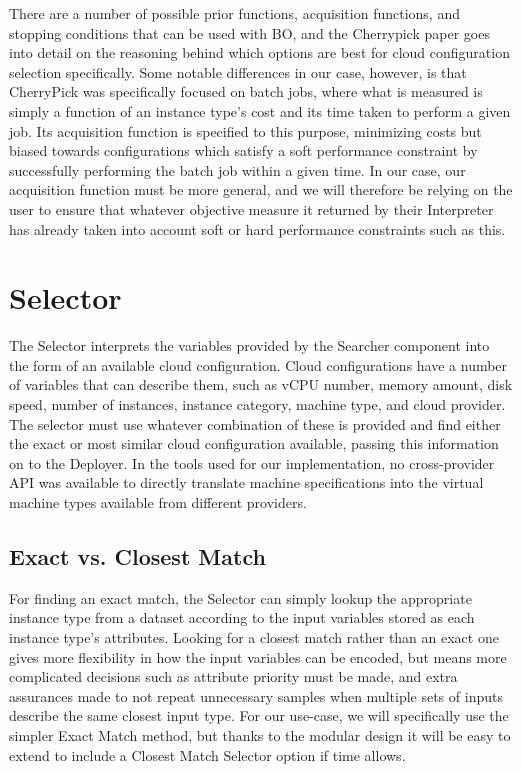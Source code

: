 \documentclass{report}
\begin{document}
There are a number of possible prior functions, acquisition functions, and stopping conditions that can be used with BO, and the Cherrypick paper goes into detail on the reasoning behind which options are best for cloud configuration selection specifically\cite{Alipourfard2017}. Some notable differences in our case, however, is that CherryPick was specifically focused on batch jobs, where what is measured is simply a function of an instance type's cost and its time taken to perform a given job. Its acquisition function is specified to this purpose, minimizing costs but biased towards configurations which satisfy a soft performance constraint by successfully performing the batch job within a given time. In our case, our acquisition function must be more general, and we will therefore be relying on the user to ensure that whatever objective measure it returned by their Interpreter has already taken into account soft or hard performance constraints such as this.
\section{Selector}
The Selector interprets the variables provided by the Searcher component into the form of an available cloud configuration. Cloud configurations have a number of variables that can describe them, such as vCPU number, memory amount, disk speed, number of instances, instance category, machine type, and cloud provider. The selector must use whatever combination of these is provided and find either the exact or most similar cloud configuration available, passing this information on to the Deployer. In the tools used for our implementation, no cross-provider API was available to directly translate machine specifications into the virtual machine types available from different providers. 

\subsection{Exact vs. Closest Match}
For finding an exact match, the Selector can simply lookup the appropriate instance type from a dataset according to the input variables stored as each instance type's attributes. Looking for a closest match rather than an exact one gives more flexibility in how the input variables can be encoded, but means more complicated decisions such as attribute priority must be made, and extra assurances made to not repeat unnecessary samples when multiple sets of inputs describe the same closest input type. For our use-case, we will specifically use the simpler Exact Match method, but thanks to the modular design it will be easy to extend to include a Closest Match Selector option if time allows.
\end{document}
